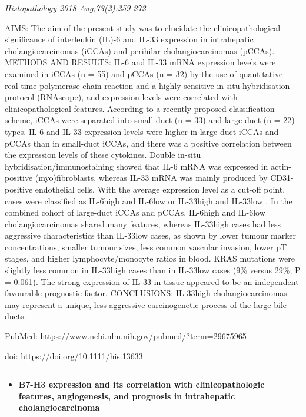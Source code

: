 \documentclass[]{article}
\providecommand{\tightlist}{%
  \setlength{\itemsep}{0pt}\setlength{\parskip}{0pt}}
\begin{document}
\emph{Histopathology 2018 Aug;73(2):259-272}

AIMS: The aim of the present study was to elucidate the
clinicopathological significance of interleukin (IL)-6 and IL-33
expression in intrahepatic cholangiocarcinomas (iCCAs) and perihilar
cholangiocarcinomas (pCCAs). METHODS AND RESULTS: IL-6 and IL-33 mRNA
expression levels were examined in iCCAs (n = 55) and pCCAs (n = 32) by
the use of quantitative real-time polymerase chain reaction and a highly
sensitive in-situ hybridisation protocol (RNAscope), and expression
levels were correlated with clinicopathological features. According to a
recently proposed classification scheme, iCCAs were separated into
small-duct (n = 33) and large-duct (n = 22) types. IL-6 and IL-33
expression levels were higher in large-duct iCCAs and pCCAs than in
small-duct iCCAs, and there was a positive correlation between the
expression levels of these cytokines. Double in-situ
hybridisation/immunostaining showed that IL-6 mRNA was expressed in
actin-positive (myo)fibroblasts, whereas IL-33 mRNA was mainly produced
by CD31-positive endothelial cells. With the average expression level as
a cut-off point, cases were classified as IL-6high and IL-6low or
IL-33high and IL-33low . In the combined cohort of large-duct iCCAs and
pCCAs, IL-6high and IL-6low cholangiocarcinomas shared many features,
whereas IL-33high cases had less aggressive characteristics than
IL-33low cases, as shown by lower tumour marker concentrations, smaller
tumour sizes, less common vascular invasion, lower pT stages, and higher
lymphocyte/monocyte ratios in blood. KRAS mutations were slightly less
common in IL-33high cases than in IL-33low cases (9\% versus 29\%; P =
0.061). The strong expression of IL-33 in tissue appeared to be an
independent favourable prognostic factor. CONCLUSIONS: IL-33high
cholangiocarcinomas may represent a unique, less aggressive
carcinogenetic process of the large bile ducts.

PubMed: \url{https://www.ncbi.nlm.nih.gov/pubmed/?term=29675965}

doi: \url{https://doi.org/10.1111/his.13633}

{}

{}

\begin{center}\rule{0.5\linewidth}{\linethickness}\end{center}

\begin{itemize}
\tightlist
\item
  \textbf{B7-H3 expression and its correlation with clinicopathologic
  features, angiogenesis, and prognosis in intrahepatic
  cholangiocarcinoma}
\end{itemize}
\end{document}
